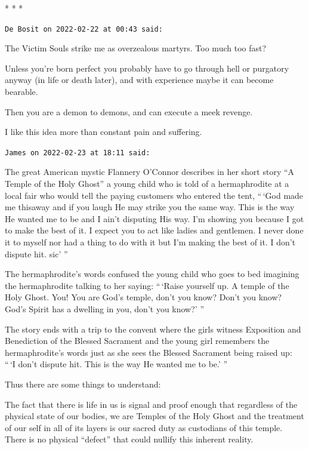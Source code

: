 
\begin{center}* * *\end{center}

\begin{footnotesize}
\begin{sffamily}
\texttt{De Bosit on 2022-02-22 at 00:43 said:}

The Victim Souls strike me as overzealous martyrs. Too much too fast?

Unless you're born perfect you probably have to go through hell or purgatory anyway (in life or death later), and with experience maybe it can become bearable.

Then you are a demon to demons, and can execute a meek revenge.

I like this idea more than constant pain and suffering.

\hfill

\texttt{James on 2022-02-23 at 18:11 said:}

The great American mystic Flannery O'Connor describes in her short story ``A Temple of the Holy Ghost'' a young child who is told of a hermaphrodite at a local fair who would tell the paying customers who entered the tent, ``\,`God made me thisaway and if you laugh He may strike you the same way. This is the way He wanted me to be and I ain't disputing His way. I'm showing you because I got to make the best of it. I expect you to act like ladies and gentlemen. I never done it to myself nor had a thing to do with it but I'm making the best of it. I don't dispute hit. sic' ''

The hermaphrodite's words confused the young child who goes to bed imagining the hermaphrodite talking to her saying: ``\,`Raise yourself up. A temple of the Holy Ghost. You! You are God's temple, don't you know? Don't you know? God's Spirit has a dwelling in you, don't you know?' ''

The story ends with a trip to the convent where the girls witness Exposition and Benediction of the Blessed Sacrament and the young girl remembers the hermaphrodite's words just as she sees the Blessed Sacrament being raised up: ``\,`I don't dispute hit. This is the way He wanted me to be.' ''

Thus there are some things to understand:

The fact that there is life in us is signal and proof enough that regardless of the physical state of our bodies, we are Temples of the Holy Ghost and the treatment of our self in all of its layers is our sacred duty as custodians of this temple. There is no physical ``defect'' that could nullify this inherent reality.


\end{sffamily}
\end{footnotesize}
